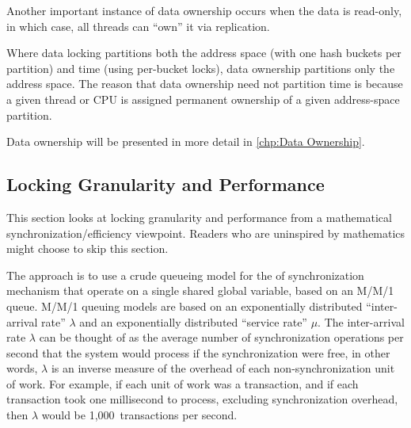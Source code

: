 Another important instance of data ownership occurs when the data
is read-only, in which case,
all threads can ``own'' it via replication.

Where data locking partitions both the address space (with one
hash buckets per partition) and time (using per-bucket locks), data
ownership partitions only the address space.
The reason that data ownership need not partition time is because a
given thread or CPU is assigned permanent ownership of a given
address-space partition.

\QuickQuizEnd

Data ownership will be presented in more detail in
\cref{chp:Data Ownership}.

\subsection{Locking Granularity and Performance}
\label{sec:SMPdesign:Locking Granularity and Performance}

This section looks at locking granularity and performance from
a mathematical synchronization\-/efficiency viewpoint.
Readers who are uninspired by mathematics might choose to skip
this section.

The approach is to use a crude queueing model for the  of
synchronization mechanism that operate on a single shared global
variable, based on an M/M/1 queue.
M/M/1 queuing models are based on an exponentially distributed
``inter-arrival rate'' $\lambda$ and an exponentially distributed
``service rate'' $\mu$.
The inter-arrival rate $\lambda$ can be thought of as the average
number of synchronization operations per second that the system
would process if the synchronization were free, in other words,
$\lambda$ is an inverse measure of the overhead of each non-synchronization
unit of work.
For example, if each unit of work was a transaction, and if each transaction
took one millisecond to process, excluding synchronization overhead,
then $\lambda$ would be 1,000~transactions per second.

